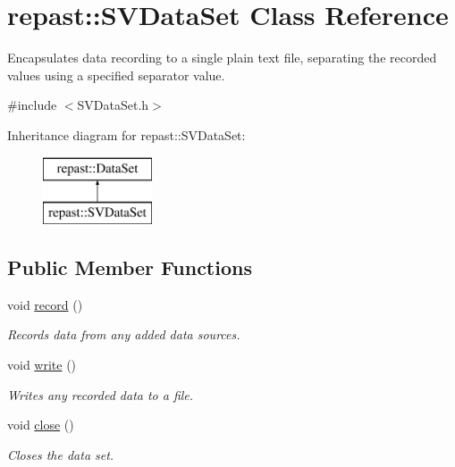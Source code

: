 \hypertarget{classrepast_1_1_s_v_data_set}{\section{repast\-:\-:S\-V\-Data\-Set Class Reference}
\label{classrepast_1_1_s_v_data_set}
}


Encapsulates data recording to a single plain text file, separating the recorded values using a specified separator value.  




{\ttfamily \#include $<$S\-V\-Data\-Set.\-h$>$}

Inheritance diagram for repast\-:\-:S\-V\-Data\-Set\-:\begin{figure}[H]
\begin{center}
\leavevmode
\includegraphics[height=2.000000cm]{classrepast_1_1_s_v_data_set}
\end{center}
\end{figure}
\subsection*{Public Member Functions}
\begin{DoxyCompactItemize}
\item 
\hypertarget{classrepast_1_1_s_v_data_set_af1bdfa60fce8e36db7f0eeae37fc868d}{void \hyperlink{classrepast_1_1_s_v_data_set_af1bdfa60fce8e36db7f0eeae37fc868d}{record} ()}\label{classrepast_1_1_s_v_data_set_af1bdfa60fce8e36db7f0eeae37fc868d}

\begin{DoxyCompactList}\small\item\em Records data from any added data sources. \end{DoxyCompactList}\item 
\hypertarget{classrepast_1_1_s_v_data_set_adfb12676d7f539297210a39ee88f36f6}{void \hyperlink{classrepast_1_1_s_v_data_set_adfb12676d7f539297210a39ee88f36f6}{write} ()}\label{classrepast_1_1_s_v_data_set_adfb12676d7f539297210a39ee88f36f6}

\begin{DoxyCompactList}\small\item\em Writes any recorded data to a file. \end{DoxyCompactList}\item 
\hypertarget{classrepast_1_1_s_v_data_set_a6349111ab0f448142bb7aeb863051d1d}{void \hyperlink{classrepast_1_1_s_v_data_set_a6349111ab0f448142bb7aeb863051d1d}{close} ()}\label{classrepast_1_1_s_v_data_set_a6349111ab0f448142bb7aeb863051d1d}

\begin{DoxyCompactList}\small\item\em Closes the data set. \end{DoxyCompactList}\end{DoxyCompactItemize}
